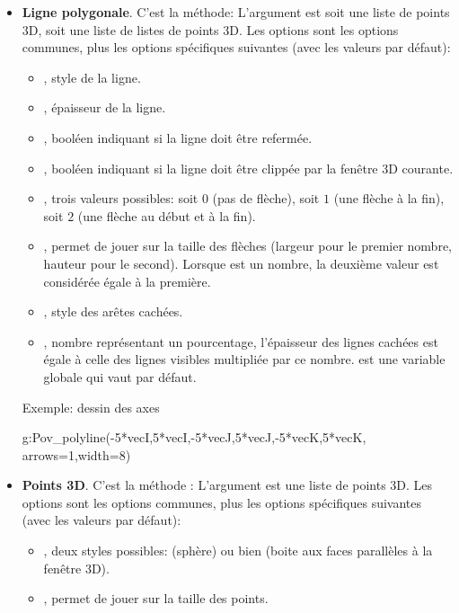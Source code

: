 \begin{itemize}
    
    \item \textbf{Ligne polygonale}. C'est la méthode:
    L'argument  est soit une liste de points 3D, soit une liste de listes de points 3D. Les options sont les options communes, plus les options spécifiques suivantes (avec les valeurs par défaut): 
        \begin{itemize}
        \item {}, style de la ligne.
        \item {}, épaisseur de la ligne.
        \item {}, booléen indiquant si la ligne doit être refermée.
        \item {}, booléen indiquant si la ligne doit être clippée par la fenêtre 3D courante.
        \item {}, trois valeurs possibles: soit $0$ (pas de flèche),  soit $1$ (une flèche à la fin), soit $2$ (une flèche au début et à la fin).
        
        \item {}, permet de jouer sur la taille des flèches (largeur pour le premier nombre, hauteur pour le second). Lorsque  est un nombre, la deuxième valeur est considérée égale à la première.
        
        \item {}, style des arêtes cachées.
        \item {}, nombre représentant un pourcentage, l'épaisseur des lignes cachées est égale à celle des lignes visibles multipliée par ce nombre.  est une variable globale qui vaut  par défaut.
        \end{itemize}
    Exemple: dessin des axes
    \begin{Luacode}
    g:Pov_polyline({{-5*vecI,5*vecI},{-5*vecJ,5*vecJ},{-5*vecK,5*vecK}}, {arrows=1,width=8})
    \end{Luacode}
    
    \item \textbf{Points 3D}. C'est la méthode : 
    L'argument  est une liste de points 3D. Les options sont les options communes, plus les options spécifiques suivantes (avec les valeurs par défaut): 
        \begin{itemize}
        \item {}, deux styles possibles:  (sphère) ou bien  (boite aux faces parallèles à la fenêtre 3D).
        \item {}, permet de jouer sur la taille des points.
    \end{itemize} 
    

\end{itemize}
